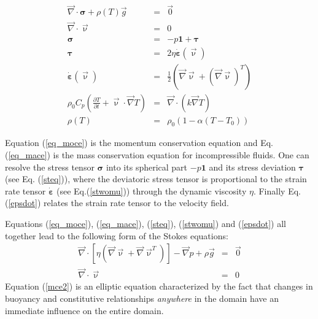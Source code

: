 \begin{eqnarray}
{\vec \nabla}\cdot {\bm \sigma} + \rho(T) {\vec g} &=& {\vec 0} \label{eq_moce}\\
{\vec \nabla}\cdot {\vec \upnu} &=& 0 \label{eq_mace}\\
{\bm \sigma} &=& -p {\bm 1} + {\bm \tau} \label{steq}\\
{\bm \tau} &=& 2 \eta \dot{\bm \varepsilon}(\vec\upnu) \label{stwomu}\\
\dot{\bm \varepsilon}(\vec\upnu)  &=& \frac{1}{2} \left( {\vec \nabla}{\vec \upnu} 
+ ({\vec \nabla}{\vec \upnu})^T  \right) \label{epsdot} \\
\rho_0 C_p \left( \frac{\partial T}{\partial t}  + {\vec \upnu}\cdot {\vec \nabla} T\right) 
&=& {\vec \nabla}\cdot (k {\vec \nabla}T)  \label{eqhte} \\
\rho(T) &=& \rho_0 (1 - \alpha (T-T_0)) 
\end{eqnarray}

Equation (\ref{eq_moce}) is the momentum conservation equation and 
Eq. (\ref{eq_mace}) is the mass conservation equation for incompressible fluids.
One can resolve the stress tensor ${\bm \sigma}$ into its spherical part $-p{\bm 1}$ and 
its stress deviation ${\bm \tau}$ (see Eq. (\ref{steq})), where the deviatoric stress tensor is 
proportional to the strain rate tensor $\dot{\bm \varepsilon}$ (see Eq.(\ref{stwomu})) through the 
dynamic viscosity $\eta$. 
Finally Eq. (\ref{epsdot}) relates the strain rate tensor to the velocity field.

Equations (\ref{eq_moce}), (\ref{eq_mace}), (\ref{steq}), (\ref{stwomu}) and (\ref{epsdot}) all 
together lead to the following form of the Stokes equations:
\begin{eqnarray}
{\vec \nabla}\cdot [\eta ({\vec\nabla} {\vec \upnu} + {\vec \nabla} {\vec \upnu}^T ) ] 
- {\vec \nabla}p + \rho {\vec g} &=& {\vec 0} \label{mce2} \\
{\vec \nabla}\cdot {\vec \upnu} &=& 0 \label{eq_mace2}
\end{eqnarray}
Equation (\ref{mce2}) is an elliptic equation characterized by the 
fact that changes in buoyancy and constitutive relationships {\it anywhere} 
in the domain have an immediate influence on the entire domain.

